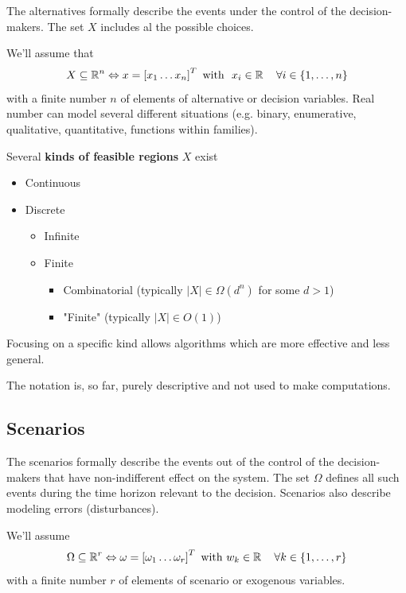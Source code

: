 The alternatives formally describe the events under the control of the decision-makers. The set $X$ includes al the possible choices.

We'll assume that 
$$ X \subseteq \operatorname{\mathbb{R}}^n \Leftrightarrow x = \left[x_1 \dots x_n \right]^T \text{ with } \ x_i \in \operatorname{\mathbb{R}} \quad \forall i \in \{1, \dots, n\} $$
with a finite number $n$ of elements of alternative or decision variables. Real number can model several different situations (e.g. binary, enumerative, qualitative, quantitative, functions within families).

Several \textbf{kinds of feasible regions} $X$ exist
\begin{itemize}
	\item Continuous
	
	\item Discrete
	\begin{itemize}
		\item Infinite
		
		\item Finite
		\begin{itemize}
			\item Combinatorial (typically $|X| \in \Omega(d^n)$ for some $d > 1$)
			
			\item "Finite" (typically $|X| \in O(1)$)
		\end{itemize}
	\end{itemize}
\end{itemize}
Focusing on a specific kind allows algorithms which are more effective and less general.

The notation is, so far, purely descriptive and not used to make computations.

\subsection{Scenarios}
\label{subsec:scenariosdef}

The scenarios formally describe the events out of the control of the decision-makers that have non-indifferent effect on the system. The set $\Omega$ defines all such events during the time horizon relevant to the decision. Scenarios also describe modeling errors (disturbances).

We'll assume 
$$ \Omega \subseteq \operatorname{\mathbb{R}}^r \Leftrightarrow \omega = \left[\omega_1 \dots \omega_r \right]^T \text{ with } w_k \in \operatorname{\mathbb{R}} \quad \forall k \in \{1, \dots, r\} $$
with a finite number $r$ of elements of scenario or exogenous variables.

